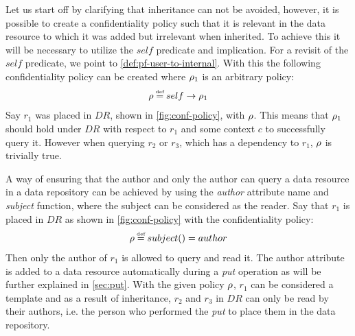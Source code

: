 \begin{example}\label{ex:avoid}
Let us start off by clarifying that inheritance can not be avoided, however, it is possible to create a confidentiality policy such that it is relevant in the data resource to which it was added but irrelevant when inherited. To achieve this it will be necessary to utilize the $self$ predicate and implication. For a revisit of the $self$ predicate, we point to \autoref{def:pf-user-to-internal}. With this the following confidentiality policy can be created where $\rho_1$ is an arbitrary policy:
\begin{align*}
    \conf \eqdef self \imply \conf_1
\end{align*}
Say $r_1$ was placed in $DR$, shown in \autoref{fig:conf-policy}, with $\rho$. This means that $\rho_1$ should hold under $DR$ with respect to $r_1$ and some context $c$ to successfully query it. However when querying $r_2$ or $r_3$, which has a dependency to $r_1$, $\rho$ is trivially true.
\end{example}

\begin{example}\label{ex:conf-reader-author}
A way of ensuring that the author and only the author can query a data resource in a data repository can be achieved by using the \emph{author} attribute name and \emph{subject} function, where the subject can be considered as the reader. Say that $r_1$ is placed in $DR$ as shown in \autoref{fig:conf-policy} with the confidentiality policy:
\begin{align*}
    \conf \eqdef subject() = author
\end{align*}
Then only the author of $r_1$ is allowed to query and read it. The author attribute is added to a data resource automatically during a \emph{put} operation as will be further explained in \autoref{sec:put}. With the given policy $\rho$, $r_1$ can be considered a template and as a result of inheritance, $r_2$ and $r_3$ in $DR$ can only be read by their authors, i.e. the person who performed the \emph{put} to place them in the data repository.
\end{example}

